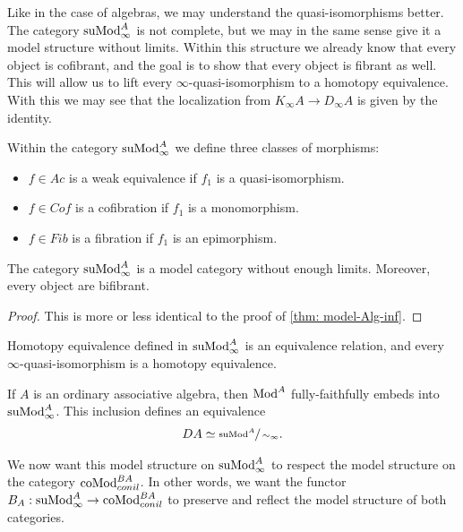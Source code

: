 \documentclass[../thesis.tex]{subfiles}
\begin{document}
            Like in the case of algebras, we may understand the quasi-isomorphisms better. The category $\tt{suMod}_\infty^A$ is not complete, but we may in the same sense give it a model structure without limits. Within this structure we already know that every object is cofibrant, and the goal is to show that every object is fibrant as well. This will allow us to lift every $\infty$-quasi-isomorphism to a homotopy equivalence. With this we may see that the localization from $K_\infty A \to D_\infty A$ is given by the identity.

            Within the category $\tt{suMod}_\infty^A$ we define three classes of morphisms:
            \begin{itemize}
                \item $f\in Ac$ is a weak equivalence if $f_1$ is a quasi-isomorphism.
                \item $f\in Cof$ is a cofibration if $f_1$ is a monomorphism.
                \item $f\in Fib$ is a fibration if $f_1$ is an epimorphism.
            \end{itemize}

            \begin{thm}
                The category $\tt{suMod}_\infty^A$ is a model category without enough limits. Moreover, every object are bifibrant.
            \end{thm}

            \begin{proof}
                This is more or less identical to the proof of \ref{thm: model-Alg-inf}.
            \end{proof}

            \begin{corollary}
                Homotopy equivalence defined in $\tt{suMod}_\infty^A$ is an equivalence relation, and every $\infty$-quasi-isomorphism is a homotopy equivalence.

                If $A$ is an ordinary associative algebra, then $\tt{Mod}^A$ fully-faithfully embeds into $\tt{suMod}_\infty^A$. This inclusion defines an equivalence
                \begin{align*}
                    DA \simeq \sfrac{\tt{suMod}^A}{\sim_\infty}\tt{.}
                \end{align*}
            \end{corollary}

            We now want this model structure on $\tt{suMod}^A_\infty$ to respect the model structure on the category $\tt{coMod}_{conil}^{BA}$. In other words, we want the functor $B_A : \tt{suMod}_\infty^A \to \tt{coMod}_{conil}^{BA}$ to preserve and reflect the model structure of both categories.
\end{document}
